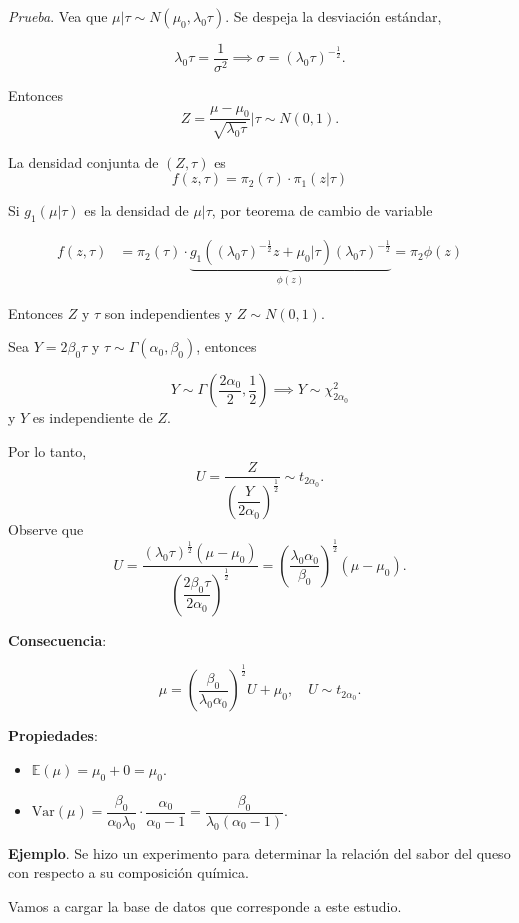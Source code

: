 \documentclass[
  12pt,
]{book}
\begin{document}
\emph{Prueba}. Vea que \(\mu|\tau \sim N(\mu_0,\lambda_0\tau)\). Se despeja la desviación estándar,

\[\lambda_0\tau = \dfrac 1{\sigma^2} \implies \sigma = (\lambda_0\tau)^{-\frac 12}.\]

Entonces \[Z = \dfrac{\mu-\mu_0}{\sqrt{\lambda_0\tau}}\Bigg|\tau \sim N(0,1).\]

La densidad conjunta de \((Z,\tau)\) es
\[f(z,\tau) = \pi_2(\tau)\cdot\pi_1(z|\tau)\]

Si \(g_1(\mu|\tau)\) es la densidad de \(\mu|\tau\), por teorema de cambio de variable

\begin{align*}
f(z,\tau) & = \pi_2(\tau)\cdot \underbrace{g_1((\lambda_0\tau)^{-\frac 12}z+\mu_0|\tau)(\lambda_0\tau)^{-\frac 12}}_{\phi(z)}
= \pi_2\phi(z)
 \end{align*}

Entonces \(Z\) y \(\tau\) son independientes y \(Z\sim N(0,1)\).

Sea \(Y = 2\beta_0\tau\) y \(\tau\sim \Gamma(\alpha_0,\beta_0)\), entonces

\[Y\sim \Gamma\left(\dfrac{2\alpha_0}{2},\dfrac12\right) \implies Y\sim \chi^2_{2\alpha_0}\]
y \(Y\) es independiente de \(Z\).

Por lo tanto,
\[U = \dfrac Z{\left( \dfrac Y{2\alpha_0}\right)^{\frac 12}}\sim t_{2\alpha_0}.\]
Observe que
\[U = \dfrac{(\lambda_0\tau)^{\frac 12}(\mu-\mu_0)}{\left( \dfrac {2\beta_0\tau}{2\alpha_0}\right)^{\frac 12}} =\left(\dfrac{\lambda_0\alpha_0}{\beta_0}\right)^{\frac 12}(\mu-\mu_0). \]

\textbf{Consecuencia}:

\[\mu =\left(\dfrac{\beta_0}{\lambda_0\alpha_0}\right)^{\frac 12} U+\mu_0,\quad U\sim t_{2\alpha_0}.\]

\textbf{Propiedades}:

\begin{itemize}
\item
  \(\mathbb E(\mu) = \mu_0 + 0 = \mu_0\).
\item
  \(\text{Var}(\mu) = \dfrac{\beta_0}{\alpha_0\lambda_0}\cdot \dfrac{\alpha_0}{\alpha_0-1} = \dfrac{\beta_0}{\lambda_0(\alpha_0-1)}\).
\end{itemize}

\textbf{Ejemplo}. Se hizo un experimento para determinar la relación del sabor del
queso con respecto a su composición química.

Vamos a cargar la base de datos que corresponde a este estudio.
\end{document}
